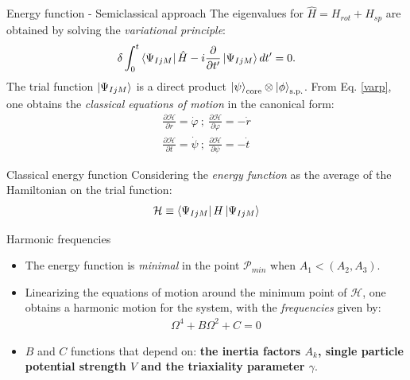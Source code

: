 \documentclass{beamer}
\begin{document}
\begin{frame}{Energy function - Semiclassical approach}
      The eigenvalues for $\hat{H}=H_{rot}+H_{sp}$ are obtained by solving the \emph{variational principle}:
  \begin{align}
    \delta \int_0^t\bra{\Psi_{IjM}}\hat{H}-i\frac{\partial}{\partial t'}\ket{\Psi_{IjM}}dt'=0. \label{varp}
  \end{align}
  The trial function $\ket{\Psi_{IjM}}$ is a direct product $\ket{\psi}_\text{core}\otimes\ket{\phi}_\text{s.p.}$.
    From Eq. \ref{varp}, one obtains the \emph{classical equations of motion} in the canonical form:
  \begin{align}
    \frac{\partial \mathcal{H}}{\partial r}=\dot{\varphi}\ ;\ \frac{\partial\mathcal{H}}{\partial\varphi}=-\dot{r}\\
    \frac{\partial \mathcal{H}}{\partial t}=\dot{\psi}\ ;\ \frac{\partial\mathcal{H}}{\partial \psi}=-\dot{t}
  \end{align}
\end{frame}


\begin{frame}{Classical energy function}
Considering the \emph{energy function} as the average of the Hamiltonian on the trial function:
  \begin{align}
    \mathcal{H}\equiv\bra{\Psi_{IjM}}H\ket{\Psi_{IjM}}
  \end{align}
  \begin{block}{Harmonic frequencies}
  \begin{itemize}
      \item The energy function is \emph{minimal} in the point $\mathcal{P}_{min}$ when $A_1<(A_2,A_3)$.
      \item Linearizing the equations of motion around the minimum point of $\mathcal{H}$, one obtains a harmonic motion for the system, with the \emph{frequencies} given by:
  \begin{align}
    \Omega^4+B\Omega^2+C=0 \label{omegaeq}
  \end{align}
  \item $B$ and $C$ functions that depend on: \textbf{the inertia factors $A_k$, single particle potential strength $V$ and the triaxiality parameter $\gamma$}.
  \end{itemize}  
  \end{block}
\end{frame}
\end{document}
